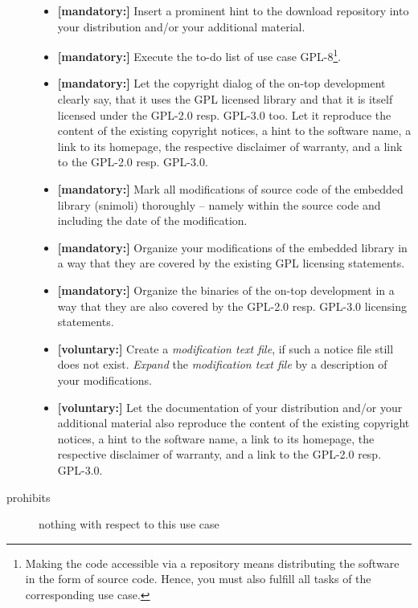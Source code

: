 \begin{description}
\begin{itemize}
  \item \textbf{[mandatory:]} Insert a prominent hint to the download repository
  into your distribution and/or your additional material.
    
  \item \textbf{[mandatory:]} Execute the to-do list of use case GPL-8\footnote{
  Making the code accessible via a repository means distributing the software in
  the form of source code. Hence, you must also fulfill all tasks of the
  corresponding use case.}.

  \item \textbf{[mandatory:]} Let the copyright dialog of the on-top development
  clearly say, that it uses the GPL licensed library and that it is itself
  licensed under the GPL-2.0 resp. GPL-3.0 too. Let it reproduce the content of
  the existing copyright notices, a hint to the software name, a link to its
  homepage, the respective disclaimer of warranty, and a link to the GPL-2.0
  resp. GPL-3.0.
  
  \item \textbf{[mandatory:]} Mark all modifications of source code of the
  embedded library (snimoli) thoroughly -- namely within the source code and
  including the date of the modification.
  
  \item \textbf{[mandatory:]} Organize your modifications of the embedded
  library in a way that they are covered by the existing GPL licensing
  statements. 
  
  \item \textbf{[mandatory:]} Organize the binaries of the on-top development in
  a way that they are also covered by the GPL-2.0 resp. GPL-3.0 licensing
  statements.
       
  \item \textbf{[voluntary:]} Create a \emph{modification text file}, if such a
  notice file still does not exist. \emph{Expand} the \emph{modification text
  file} by a description of your modifications.
    
  \item \textbf{[voluntary:]} Let the documentation of your distribution and/or
  your additional material also reproduce the content of the existing copyright
  notices, a hint to the software name, a link to its homepage, the respective
  disclaimer of warranty, and a link to the GPL-2.0 resp.
  GPL-3.0.
  
\end{itemize}

\item[prohibits] nothing with respect to this use case

\end{description}

